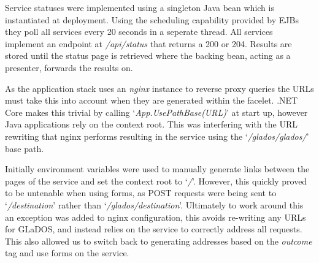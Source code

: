 \par
Service statuses were implemented using a singleton Java bean which is instantiated at deployment. Using the scheduling capability provided by EJBs they poll all services every 20 seconds in a seperate thread. All services implement an endpoint at \textit{/api/status} that returns a 200 or 204. Results are stored until the status page is retrieved where the backing bean, acting as a presenter, forwards the results on.

\par
As the application stack uses an \textit{nginx} instance to reverse proxy queries the URLs must take this into account when they are generated within the facelet. .NET Core makes this trivial by calling `\textit{App.UsePathBase(URL)}' at start up, however Java applications rely on the context root. This was interfering with the URL rewriting that nginx performs resulting in the service using the 
`\textit{/glados/glados/}' base path.

\par
Initially environment variables were used to manually generate links between the pages of the service and set the context root to 
`\textit{/}'. However, this quickly proved to be untenable when using forms, as POST requests were being sent to 
`\textit{/destination}' 
rather than 
`\textit{/glados/destination}'. Ultimately to work around this an exception was added to nginx configuration, this avoids re-writing any URLs for GLaDOS, and instead relies on the service to correctly address all requests. This also allowed us to switch back to generating addresses based on the \textit{outcome} tag and use forms on the service.
